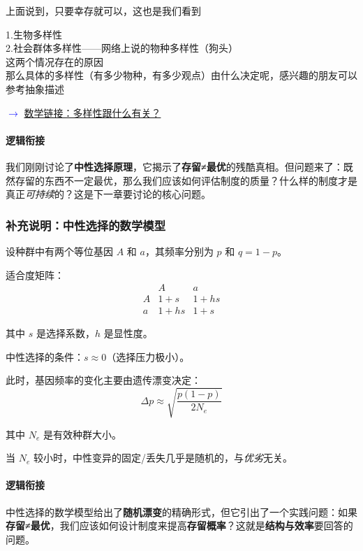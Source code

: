 \documentclass[openany, a4paper, 12pt]{book}
\newcommand{\mathlink}[2]{%
	\par\noindent
	\textcolor{blue}{\small$\rightarrow$ \hyperref[#1]{#2}}
	\par
}
\begin{document}
上面说到，只要幸存就可以，这也是我们看到

1.生物多样性
\\
2.社会群体多样性——网络上说的物种多样性（狗头）
\\
这两个情况存在的原因
\\
那么具体的多样性（有多少物种，有多少观点）由什么决定呢，感兴趣的朋友可以参考抽象描述
\label{main:various}

\mathlink{math:various}{数学链接：多样性跟什么有关？}


	\paragraph*{逻辑衔接}
	我们刚刚讨论了\textbf{中性选择原理}，它揭示了\textbf{存留≠最优}的残酷真相。但问题来了：既然存留的东西不一定最优，那么我们应该如何评估制度的质量？什么样的制度才是真正\textit{可持续}的？这是下一章要讨论的核心问题。

	\subsubsection*{补充说明：中性选择的数学模型}
	\begin{tcolorbox}[
		colback=gray!5,
		colframe=gray!40,
		title=\small \textit{严谨推导（可跳过）},
		fonttitle=\bfseries
		]
		\small
		设种群中有两个等位基因 $A$ 和 $a$，其频率分别为 $p$ 和 $q=1-p$。

		适合度矩阵：
		\[
		\begin{array}{c|cc}
			& A & a \\
			\hline
			A & 1+s & 1+hs \\
			a & 1+hs & 1+s
		\end{array}
		\]

		其中 $s$ 是选择系数，$h$ 是显性度。

		中性选择的条件：$s \approx 0$（选择压力极小）。

		此时，基因频率的变化主要由遗传漂变决定：
		\[ \Delta p \approx \sqrt{\frac{p(1-p)}{2N_e}} \]

		其中 $N_e$ 是有效种群大小。

		当 $N_e$ 较小时，中性变异的固定/丢失几乎是随机的，与\textit{优劣}无关。
	\end{tcolorbox}

	\paragraph*{逻辑衔接}
	中性选择的数学模型给出了\textbf{随机漂变}的精确形式，但它引出了一个实践问题：如果\textbf{存留≠最优}，我们应该如何设计制度来提高\textbf{存留概率}？这就是\textbf{结构与效率}要回答的问题。
\end{document}
